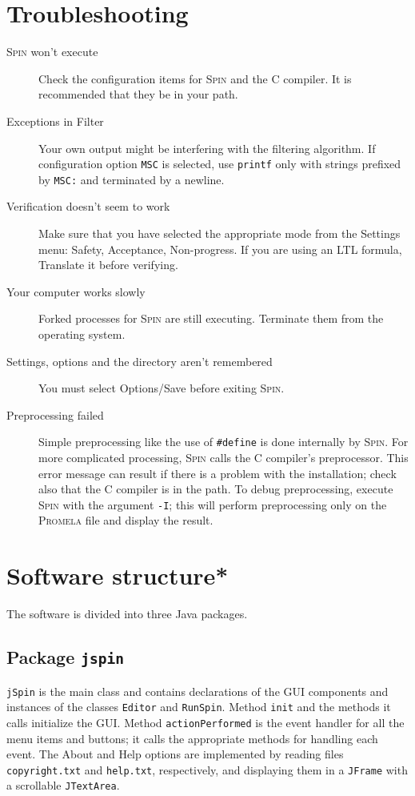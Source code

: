 \documentclass[11pt]{article}
\newcommand{\spn}{\textsc{Spin}}
\newcommand{\prm}{\textsc{Promela}}
\newcommand{\p}[1]{\texttt{#1}}
\newcommand{\bu}[1]{\textsf{#1}}
\begin{document}
\section{Troubleshooting}
\begin{description}
\item[\spn{} won't execute] Check the configuration items
for \spn{} and the C compiler.
It is recommended that they be in your path.
\item[Exceptions in Filter] Your own output might be
interfering with the filtering algorithm.
If configuration option \p{MSC} is selected, use \p{printf} only with strings
prefixed by \p{MSC:} and terminated by a newline.
\item[Verification doesn't seem to work]
Make sure that you have selected the appropriate mode
from the \bu{Settings} menu:
\bu{Safety}, \bu{Acceptance}, \bu{Non-progress}.
If you are using an LTL formula,
\bu{Translate} it before verifying.
\item[Your computer works slowly] Forked processes for \spn{} are still executing.
Terminate them from the operating system.
\item[Settings, options and the directory aren't remembered]
You must select \bu{Options/Save} before exiting \spn{}.
\item[Preprocessing failed] Simple preprocessing like the use of \verb=#define= 
is done internally by \spn{}. For more complicated processing, \spn{} calls the 
C compiler's preprocessor. This error message can result if there is a problem
with the installation; check also that the C compiler is in the path.
To debug preprocessing, execute \spn{} with the argument \p{-I};
this will perform preprocessing only on the \prm{} file and display the result. 
\end{description}

\newpage

\section{Software structure*}
The software is divided into three Java packages.

\subsection{Package \p{jspin}}
\p{jSpin} is the main class and contains declarations
of the GUI components and instances
of the classes \p{Editor} and \p{RunSpin}.
Method \p{init} and the methods it calls initialize the GUI.
Method \p{action\-Per\-formed} is the event handler for all the menu items
and buttons; it calls the appropriate methods for handling each event.
The \bu{About} and \bu{Help} options are implemented by reading files
\p{copyright.txt} and \p{help.txt}, respectively, and displaying
them in a \p{JFrame} with a scrollable \p{JTextArea}.
\end{document}
